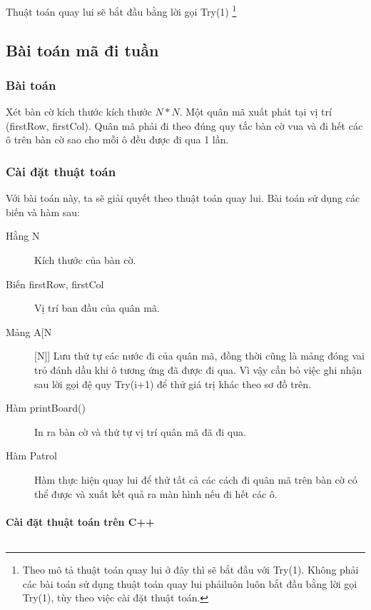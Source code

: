 \documentclass[8pt, a4paper]{article}
\newcommand{\mnt}[1]{\inputminted[frame=single, linenos=true, tabsize=4]{c++}{#1}}
\begin{document}
Thuật toán quay lui sẽ bắt đầu bằng lời gọi Try(1) \footnote{Theo mô tả thuật toán quay lui ở đây thì sẽ bắt đầu với Try(1). Không phải các bài toán sử dụng thuật toán quay lui phảiluôn luôn bắt đầu bằng lời gọi Try(1), tùy theo việc cài đặt thuật toán.}
\subsection{Bài toán mã đi tuần}

\subsubsection{Bài toán}

Xét bàn cờ kích thước kích thước $N*N$. Một quân mã xuất phát tại vị trí (firstRow, firstCol). Quân mã phải đi theo đúng quy tắc bàn cờ vua và đi hết các ô trên bàn cờ sao cho mỗi ô đều được đi qua 1 lần.

\subsubsection{Cài đặt thuật toán}

Với bài toán này, ta sẽ giải quyết theo thuật toán quay lui. Bài toán sử dụng các biến và hàm sau:

\begin{description}
\item [Hằng N] Kích thước của bàn cờ.
\item [Biến firstRow, firstCol] Vị trí ban đầu của quân mã.
\item [Mảng A[N][N]] Lưu thứ tự các nước đi của quân mã, đồng thời cũng là mảng đóng vai trỏ đánh dầu khi ô tương ứng đã được đi qua. Vì vậy cần bỏ việc ghi nhận sau lời gọi đệ quy Try(i+1) để thử giá trị khác theo sơ đồ trên.
\item [Hàm printBoard()] In ra bàn cờ và thứ tự vị trí quân mã đã đi qua.
\item [Hàm Patrol] Hàm thực hiện quay lui để thử tất cả các cách đi quân mã trên bàn cờ có thể được và xuất kết quả ra màn hình nếu đi hết các ô.
\end{description}

\paragraph{Cài đặt thuật toán trên C++}
\mnt{src/knight.cpp}
\end{document}
